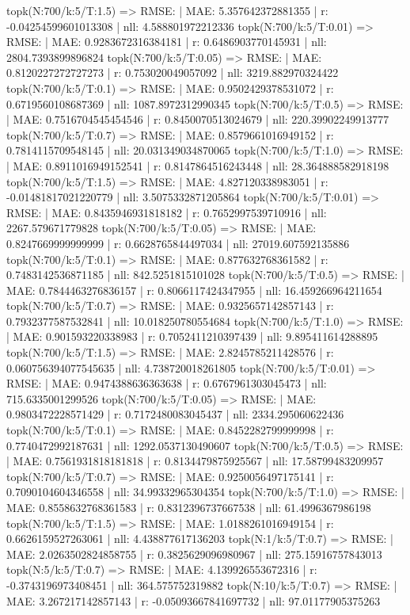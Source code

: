 topk(N:700/k:5/T:1.5) => RMSE: | MAE: 5.357642372881355 | r: -0.04254599601013308 | nll: 4.588801972212336
topk(N:700/k:5/T:0.01) => RMSE: | MAE: 0.9283672316384181 | r: 0.6486903770145931 | nll: 2804.7393899896824
topk(N:700/k:5/T:0.05) => RMSE: | MAE: 0.8120227272727273 | r: 0.753020049057092 | nll: 3219.882970324422
topk(N:700/k:5/T:0.1) => RMSE: | MAE: 0.9502429378531072 | r: 0.6719560108687369 | nll: 1087.8972312990345
topk(N:700/k:5/T:0.5) => RMSE: | MAE: 0.7516704545454546 | r: 0.8450070513024679 | nll: 220.39902249913777
topk(N:700/k:5/T:0.7) => RMSE: | MAE: 0.8579661016949152 | r: 0.7814115709548145 | nll: 20.031349034870065
topk(N:700/k:5/T:1.0) => RMSE: | MAE: 0.8911016949152541 | r: 0.8147864516243448 | nll: 28.364888582918198
topk(N:700/k:5/T:1.5) => RMSE: | MAE: 4.827120338983051 | r: -0.01481817021220779 | nll: 3.5075332871205864
topk(N:700/k:5/T:0.01) => RMSE: | MAE: 0.8435946931818182 | r: 0.7652997539710916 | nll: 2267.579671779828
topk(N:700/k:5/T:0.05) => RMSE: | MAE: 0.8247669999999999 | r: 0.6628765844497034 | nll: 27019.607592135886
topk(N:700/k:5/T:0.1) => RMSE: | MAE: 0.877632768361582 | r: 0.7483142536871185 | nll: 842.5251815101028
topk(N:700/k:5/T:0.5) => RMSE: | MAE: 0.7844463276836157 | r: 0.8066117424347955 | nll: 16.459266964211654
topk(N:700/k:5/T:0.7) => RMSE: | MAE: 0.9325657142857143 | r: 0.7932377587532841 | nll: 10.018250780554684
topk(N:700/k:5/T:1.0) => RMSE: | MAE: 0.901593220338983 | r: 0.7052411210397439 | nll: 9.895411614288895
topk(N:700/k:5/T:1.5) => RMSE: | MAE: 2.8245785211428576 | r: 0.060756394077545635 | nll: 4.738720018261805
topk(N:700/k:5/T:0.01) => RMSE: | MAE: 0.9474388636363638 | r: 0.6767961303045473 | nll: 715.6335001299526
topk(N:700/k:5/T:0.05) => RMSE: | MAE: 0.9803472228571429 | r: 0.7172480083045437 | nll: 2334.295060622436
topk(N:700/k:5/T:0.1) => RMSE: | MAE: 0.8452282799999998 | r: 0.7740472992187631 | nll: 1292.0537130490607
topk(N:700/k:5/T:0.5) => RMSE: | MAE: 0.7561931818181818 | r: 0.8134479875925567 | nll: 17.58799483209957
topk(N:700/k:5/T:0.7) => RMSE: | MAE: 0.9250056497175141 | r: 0.7090104604346558 | nll: 34.99332965304354
topk(N:700/k:5/T:1.0) => RMSE: | MAE: 0.8558632768361583 | r: 0.8312396737667538 | nll: 61.4996367986198
topk(N:700/k:5/T:1.5) => RMSE: | MAE: 1.0188261016949154 | r: 0.6626159527263061 | nll: 4.438877617136203
topk(N:1/k:5/T:0.7) => RMSE: | MAE: 2.0263502824858755 | r: 0.3825629096980967 | nll: 275.15916757843013
topk(N:5/k:5/T:0.7) => RMSE: | MAE: 4.139926553672316 | r: -0.3743196973408451 | nll: 364.575752319882
topk(N:10/k:5/T:0.7) => RMSE: | MAE: 3.267217142857143 | r: -0.05093667841697732 | nll: 97.01177905375263
